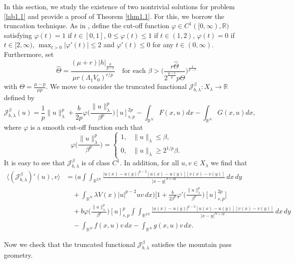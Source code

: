 \documentclass[10pt,a4paper]{amsart}
\numberwithin{equation}{section}
\begin{document}
In this section, we study the existence of two nontrivial solutions for problem 
\eqref{lab1.1} and provide a proof of Theorem \ref{thm1.1}. For this, we borrow the 
truncation technique. As in \cite{r16}, define the cut-off function 
$\varphi \in C^1([0,\infty),  \mathbb{R})$  satisfying $\varphi(t)=1$ if $t\in[0,1]$, 
$0\leq\varphi(t)\leq1$ if $t\in(1,2)$, $\varphi(t)=0$ if $t\in[2,\infty)$, 
$\max_{t>0}|\varphi'(t)|\leq2$ and $\varphi'(t)\leq0$ for any $t\in(0,\infty)$.
 Furthermore, set
\[
\widehat{\Theta}=\frac{(\mu+r)|h|_{\frac{p}{p-r}}}{\mu r (\Lambda_1 V_0)^{r/p}}
\quad\text{for each }
\beta>\Big(\frac{r\widehat{\Theta}}{2^{\frac{p-r}{p}} p\Theta }\Big)^{\frac{1}{p-r}}
\]
with $\Theta=\frac{\mu-p}{\mu p}$. We move to consider the truncated functional 
$\mathcal{J}^\beta_{b,\lambda}: X_\lambda\to  \mathbb{R}$ defined by
$$
 \mathcal{J}^\beta_{b,\lambda}(u)=\frac{1}{p}\|u\|^p_\lambda+\frac{b}{2p}\varphi\Big( \frac{\|u\|^p_\lambda}{\beta^p}
\Big)[u]^{2p}_{s,p}-\int_{\mathbb{R}^N}F(x,u)dx-\int_{\mathbb{R}^N}G(x,u)dx,
$$
where $\varphi$ is a smooth cut-off function such that
\[
\varphi\Big( \frac{\|u\|^p_\lambda}{\beta^p} \Big)=
\begin{cases}
1, & \|u\|_\lambda \leq \beta, \\
0,& \|u\|_\lambda \geq 2^{1/p}\beta.
\end{cases}
\]
It is easy to see that $\mathcal{J}^\beta_{b,\lambda}$ is of class $C^1$. 
In addition, for all $u, v\in X_\lambda$ we find that
\begin{align*}
\langle (\mathcal{J}^\beta_{b,\lambda})'(u),v\rangle
&= \Big(a\int\int_{\mathbb{R}^{2N}}\frac{|u(x)-u(y)|^{p-2}[u(x)-u(y)]
 [v(x)-v(y)]}{|x-y|^{N+sp}}\,dx\,dy  \\
&\quad +\int_{\mathbb{R}^N}\lambda V(x)|u|^{p-2}uv\,dx\Big) 
\Big[1+\frac{b}{2\beta^p}\varphi'\Big( \frac{\|u\|^p_\lambda}{\beta^p} 
 \Big)[u]_{s,p}^{2p}\Big]  \\
&\quad +b \varphi\Big( \frac{\|u\|^p_\lambda}{\beta^p} \Big)
 [u]_{s,p}^p\int\int_{\mathbb{R}^{2N}}\frac{|u(x)-u(y)|^{p-2}[u(x)-u(y)][v(x)
 -v(y)]}{|x-y|^{N+sp}}\,dx\,dy  \\
&\quad -\int_{\mathbb{R}^N}f(x,u)v\,dx-\int_{\mathbb{R}^N}g(x,u)v\,dx.
\end{align*}

Now we check that the truncated functional $\mathcal{J}^\beta_{b,\lambda}$ 
satisfies the mountain pass geometry.
\end{document}

